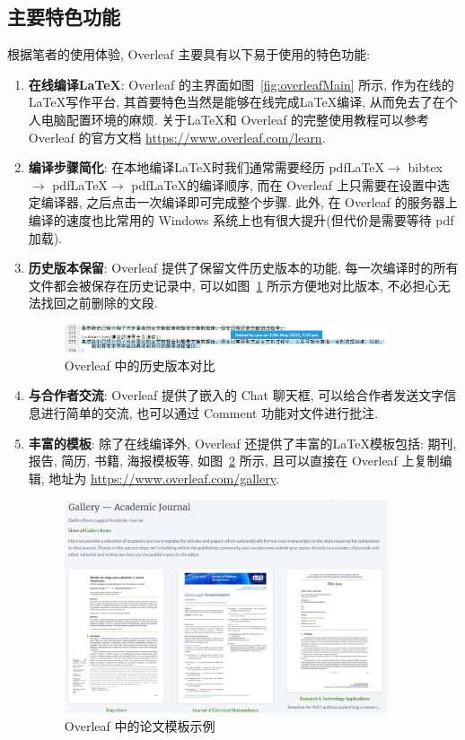 \documentclass{booki}
\begin{document}
\subsection{主要特色功能}\label{subsection:features}
{根据笔者的使用体验, Overleaf 主要具有以下易于使用的特色功能:}
\begin{enumerate}
    \item \textbf{在线编译\LaTeX }: Overleaf 的主界面如图~\ref{fig:overleafMain} 所示, 作为在线的\LaTeX 写作平台, 其首要特色当然是能够在线完成\LaTeX 编译, 从而免去了在个人电脑配置环境的麻烦. 关于\LaTeX 和 Overleaf 的完整使用教程可以参考 Overleaf 的官方文档 \url{https://www.overleaf.com/learn}.
    \item \textbf{编译步骤简化}: 在本地编译\LaTeX 时我们通常需要经历 pdf\LaTeX $\rightarrow$ bibtex $\rightarrow$ pdf\LaTeX $\rightarrow$ pdf\LaTeX 的编译顺序, 而在 Overleaf 上只需要在设置中选定编译器, 之后点击一次编译即可完成整个步骤. 此外, 在 Overleaf 的服务器上编译的速度也比常用的 Windows 系统上也有很大提升(但代价是需要等待 pdf 加载).
    \item \textbf{历史版本保留}: Overleaf 提供了保留文件历史版本的功能, 每一次编译时的所有文件都会被保存在历史记录中, 可以如图~\ref{fig:history} 所示方便地对比版本, 不必担心无法找回之前删除的文段.
          \begin{figure}[H]
              \centering
              \includegraphics[width=0.9\textwidth]{figure/history.png}
              \caption{Overleaf 中的历史版本对比}
              \label{fig:history}
          \end{figure}
    \item \textbf{与合作者交流}: Overleaf 提供了嵌入的 Chat 聊天框, 可以给合作者发送文字信息进行简单的交流, 也可以通过 Comment 功能对文件进行批注.
    \item \textbf{丰富的模板}: 除了在线编译外, Overleaf 还提供了丰富的\LaTeX 模板包括: 期刊, 报告, 简历, 书籍, 海报模板等, 如图~\ref{fig:template} 所示, 且可以直接在 Overleaf 上复制编辑, 地址为 \url{https://www.overleaf.com/gallery}.
          \begin{figure}[htbp]
              \centering
              \includegraphics[width=0.9\textwidth]{figure/template.png}
              \caption{Overleaf 中的论文模板示例}
              \label{fig:template}
          \end{figure}
\end{enumerate}
\end{document}
